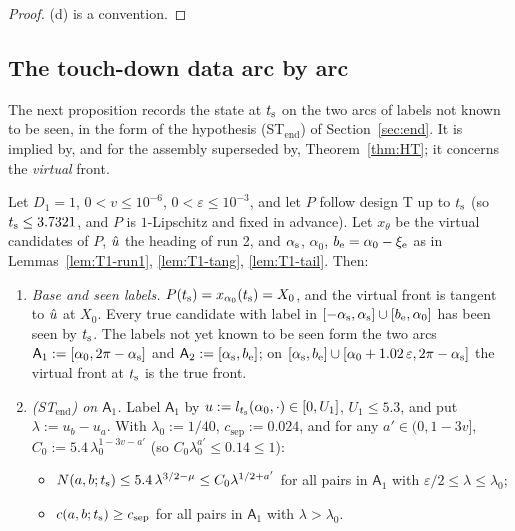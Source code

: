 \begin{proof}
(d) is a convention.
\end{proof}

\subsection{The touch-down data arc by arc}\label{sec:T1-arcs}

The next proposition records the state at $t_{\mathrm s}$ on the two arcs of labels not known to be seen, in the form of the hypothesis
\textup{(ST$_{\mathrm{end}}$)} of Section~\ref{sec:end}. It is implied by, and for the assembly superseded by,
Theorem~\ref{thm:HT}; it concerns the \emph{virtual} front.

\begin{proposition}\label{prop:T1-arcs}
Let $D_1=1$, $0<v\le10^{-6}$, $0<\varepsilon\le10^{-3}$, and let $P$ follow design T up to $t_{\mathrm s}$ (so $t_{\mathrm s}\le3.7321$, and $P$ is
$1$-Lipschitz and fixed in advance). Let $x_\theta$ be the virtual candidates of $P$, $\hat u$ the heading of run 2, and $\alpha_{\mathrm s}$,
$\alpha_0$, $b_{\mathrm e}=\alpha_0-\xi_{\mathrm e}$ as in Lemmas~\ref{lem:T1-run1}, \ref{lem:T1-tang}, \ref{lem:T1-tail}. Then:
\begin{enumerate}
\item[(0)] \emph{Base and seen labels.} $P(t_{\mathrm s})=x_{\alpha_0}(t_{\mathrm s})=X_0$, and the virtual front is tangent to $\hat u$ at $X_0$. Every true
candidate with label in $[-\alpha_{\mathrm s},\alpha_{\mathrm s}]\cup[b_{\mathrm e},\alpha_0]$ has been seen by $t_{\mathrm s}$. The labels not yet known to be seen form the two
arcs $\mathsf A_1:=[\alpha_0,2\pi-\alpha_{\mathrm s}]$ and $\mathsf A_2:=[\alpha_{\mathrm s},b_{\mathrm e}]$; on
$[\alpha_{\mathrm s},b_{\mathrm e}]\cup[\alpha_0+1.02\,\varepsilon,2\pi-\alpha_{\mathrm s}]$ the virtual front at $t_{\mathrm s}$ is the true front.
\item[(1)] \emph{\textup{(ST$_{\mathrm{end}}$)} on $\mathsf A_1$.} Label $\mathsf A_1$ by $u:=l_{t_{\mathrm s}}(\alpha_0,\cdot)\in[0,U_1]$,
$U_1\le5.3$, and put $\lambda:=u_b-u_a$. With $\lambda_0:=1/40$, $c_{\mathrm{sep}}:=0.024$, and for any $a'\in(0,1-3v]$,
$C_0:=5.4\,\lambda_0^{1-3v-a'}$ (so $C_0\lambda_0^{a'}\le0.14\le1$):
\begin{itemize}
\item[\textup{(E1)}] $N(a,b;t_{\mathrm s})\le5.4\,\lambda^{3/2-\mu}\le C_0\lambda^{1/2+a'}$ for all pairs in $\mathsf A_1$ with
$\varepsilon/2\le\lambda\le\lambda_0$;
\item[\textup{(E2)}] $c(a,b;t_{\mathrm s})\ge c_{\mathrm{sep}}$ for all pairs in $\mathsf A_1$ with $\lambda>\lambda_0$.

\end{itemize}
\end{enumerate}
\end{proposition}
